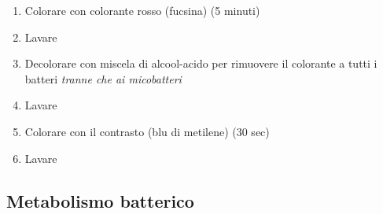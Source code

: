 \documentclass[italian,]{article}
\providecommand{\tightlist}{%
  \setlength{\itemsep}{0pt}\setlength{\parskip}{0pt}}
\newcommand{\normalbox}[2]{\begin{tcolorbox}[title=#1]#2\end{tcolorbox}} %
\begin{document}
\normalbox{Procedimento per la colorazione di Ziehl-Neelsen (specifica per micobatteri)}{
\begin{enumerate} \def\labelenumi{\arabic{enumi}.} \tightlist \item Colorare con colorante rosso (fucsina) (5 minuti) \item Lavare \item Decolorare con miscela di alcool-acido per rimuovere il colorante a tutti i batteri \emph{tranne che ai micobatteri} \item Lavare \item Colorare con il contrasto (blu di metilene) (30 sec) \item Lavare \end{enumerate}
}

\hypertarget{metabolismo-batterico}{%
\subsection{Metabolismo batterico}\label{metabolismo-batterico}}
\end{document}
